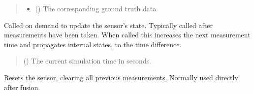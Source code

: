\documentclass[letterpaper,10pt,english]{sphinxmanual}
\begin{document}
\begin{fulllineitems}
\begin{fulllineitems}
\begin{quote}
\begin{description}
\begin{itemize}
\item {} 
\sphinxAtStartPar
{} ({\hyperref[\detokenize{modules/waypoints/trajectory:qnav.waypoints.trajectory.GroundTruth}]{}}) \textendash{} The corresponding ground truth data.

\end{itemize}

\end{description}\end{quote}

\end{fulllineitems}


\begin{fulllineitems}
\label{\detokenize{modules/quantum/base:qnav.quantum.base.ConceptQuantumImu.update}}
\pysigstartsignatures
{}
\pysigstopsignatures
\sphinxAtStartPar
Called on demand to update the sensor’s state.
Typically called after measurements have been taken. When called
this increases the next measurement time and propagates internal
states, to the time difference.
\begin{quote}\begin{description}
\sphinxAtStartPar
{} () \textendash{} The current simulation time in seconds.

\end{description}\end{quote}

\end{fulllineitems}


\begin{fulllineitems}
\label{\detokenize{modules/quantum/base:qnav.quantum.base.ConceptQuantumImu.reset}}
\pysigstartsignatures
{}
\pysigstopsignatures
\sphinxAtStartPar
Resets the sensor, clearing all previous measurements.
Normally used directly after fusion.


\end{fulllineitems}
\end{fulllineitems}
\end{document}
